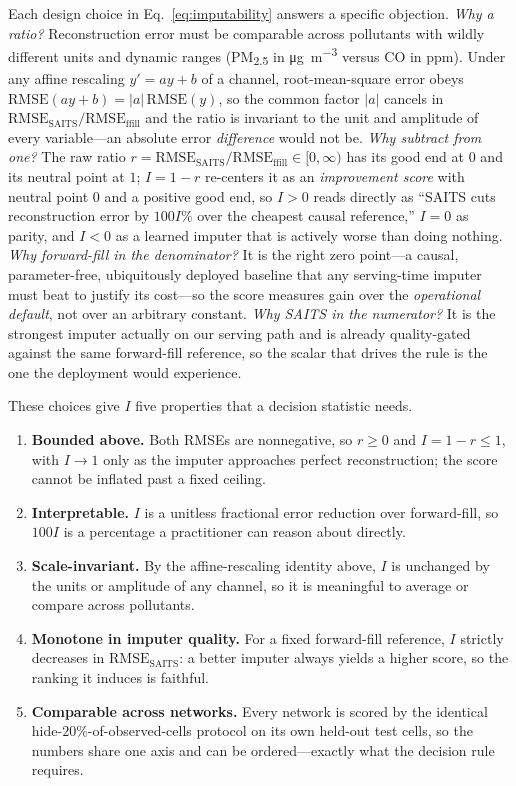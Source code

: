 \documentclass[review,3p,times]{elsarticle}
\newcommand{\ugm}{\si{\micro\gram\per\cubic\metre}}
\newcommand{\pmf}{PM\textsubscript{2.5}}
\begin{document}
Each design choice in Eq.~\eqref{eq:imputability} answers a specific objection.
\emph{Why a ratio?} Reconstruction error must be comparable across pollutants
with wildly different units and dynamic ranges (\pmf{} in \ugm{} versus CO in
ppm). Under any affine rescaling $y'=ay+b$ of a channel, root-mean-square error
obeys $\mathrm{RMSE}(ay+b)=|a|\,\mathrm{RMSE}(y)$, so the common factor $|a|$
cancels in $\mathrm{RMSE_{SAITS}}/\mathrm{RMSE_{ffill}}$ and the ratio is
invariant to the unit and amplitude of every variable---an absolute error
\emph{difference} would not be. \emph{Why subtract from one?} The raw ratio
$r=\mathrm{RMSE_{SAITS}}/\mathrm{RMSE_{ffill}}\in[0,\infty)$ has its good end at
$0$ and its neutral point at $1$; $I=1-r$ re-centers it as an \emph{improvement
score} with neutral point $0$ and a positive good end, so $I>0$ reads directly as
``SAITS cuts reconstruction error by $100I\%$ over the cheapest causal
reference,'' $I=0$ as parity, and $I<0$ as a learned imputer that is actively
worse than doing nothing. \emph{Why forward-fill in the denominator?} It is the
right zero point---a causal, parameter-free, ubiquitously deployed baseline that
any serving-time imputer must beat to justify its cost---so the score measures
gain over the \emph{operational default}, not over an arbitrary constant.
\emph{Why SAITS in the numerator?} It is the strongest imputer actually on our
serving path and is already quality-gated against the same forward-fill
reference, so the scalar that drives the rule is the one the deployment would
experience.

These choices give $I$ five properties that a decision statistic needs.
\begin{enumerate}
  \item \textbf{Bounded above.} Both RMSEs are nonnegative, so $r\ge0$ and
  $I=1-r\le1$, with $I\!\to\!1$ only as the imputer approaches perfect
  reconstruction; the score cannot be inflated past a fixed ceiling.
  \item \textbf{Interpretable.} $I$ is a unitless fractional error reduction over
  forward-fill, so $100I$ is a percentage a practitioner can reason about
  directly.
  \item \textbf{Scale-invariant.} By the affine-rescaling identity above, $I$ is
  unchanged by the units or amplitude of any channel, so it is meaningful to
  average or compare across pollutants.
  \item \textbf{Monotone in imputer quality.} For a fixed forward-fill reference,
  $I$ strictly decreases in $\mathrm{RMSE_{SAITS}}$: a better imputer always
  yields a higher score, so the ranking it induces is faithful.
  \item \textbf{Comparable across networks.} Every network is scored by the
  identical hide-$20\%$-of-observed-cells protocol on its own held-out test
  cells, so the numbers share one axis and can be ordered---exactly what the
  decision rule requires.
\end{enumerate}
\end{document}
